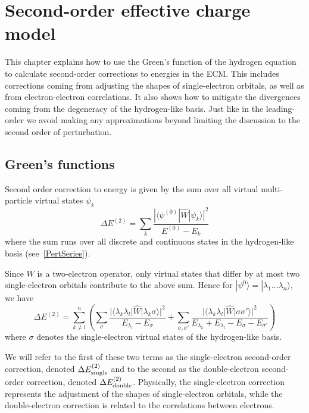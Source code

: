 \chapter{Second-order effective charge model}
\label{ch:secondECM}

This chapter explains how to use the Green's function of the hydrogen equation to calculate second-order corrections to energies in the ECM. This includes corrections coming from adjusting the shapes of single-electron orbitals, as well as from electron-electron correlations. It also shows how to mitigate the divergences coming from the degeneracy of the hydrogen-like basis. Just like in the leading-order we avoid making any approximations beyond limiting the discussion to the second order of perturbation.

\section{Green's functions}
\label{sec:Green}

Second order correction to energy is given by the sum over all virtual multi-particle virtual states $\psi_k$
\begin{equation}
    \Delta E^{(2)} = \sum_k \frac{|\langle \psi^{(0)}|\widehat{W}|\psi_k\rangle|^2}{E^{(0)}-E_k}
\end{equation}
where the sum runs over all discrete and continuous states in the hydrogen-like basis  (see~\eqref{PertSeries}).

Since $W$ is a two-electron operator, only virtual states that differ by at most two single-electron orbitals contribute to the above sum. Hence for $|\psi^{0}\rangle = |\lambda_1...\lambda_n\rangle$, we have
\begin{equation} \label{SecondSigma}
    \Delta E^{(2)} = \sum_{k \neq l}^n \left(\sum_{\sigma} \frac{|\langle \lambda_k \lambda_l|\widehat{W}|\lambda_k \sigma \rangle|^2}{E_{\lambda_l}-E_\sigma} + \sum_{\sigma,\sigma'}\frac{|\langle \lambda_k \lambda_l|\widehat{W}|\sigma \sigma' \rangle|^2}{E_{\lambda_k}+E_{\lambda_l}-E_\sigma-E_{\sigma'}}\right)
\end{equation}
where $\sigma$ denotes the single-electron virtual states of the hydrogen-like basis.

We will refer to the first of these two terms as the single-electron second-order correction, denoted $\Delta E^{(2)}_{\rm{single}}$ and to the second as the double-electron second-order correction, denoted $\Delta E^{(2)}_{\rm{double}}$. Physically, the single-electron correction represents the adjustment of the shapes of single-electron orbitals, while the double-electron correction is related to the correlations between electrons.


